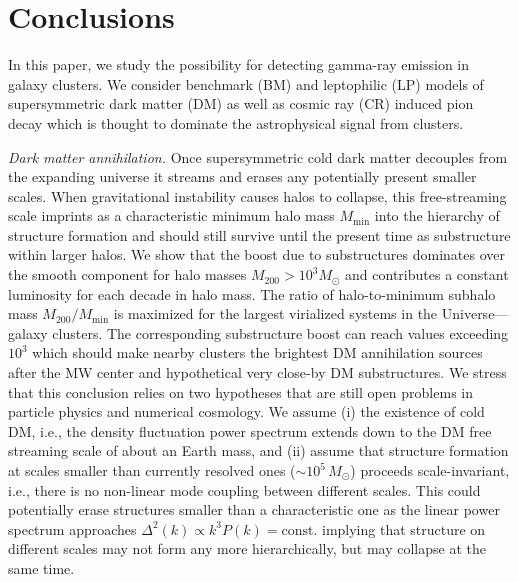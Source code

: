 \documentclass[10pt,aps,pra,reprint,amsmath,amsfonts,amssymb,showpacs,nofootinbib,floatfix]{revtex4-1}
\newcommand{\rmn}{\mathrm}
\newcommand{\msun}{M_\odot}
\newcommand{\mvir}{M_{200}}
\begin{document}
\section{Conclusions}

In this paper, we study the possibility for detecting gamma-ray
emission in galaxy clusters. We consider benchmark (BM) and
leptophilic (LP) models of supersymmetric dark matter (DM) as well as
cosmic ray (CR) induced pion decay which is thought to dominate the
astrophysical signal from clusters.

{\em Dark matter annihilation.} Once supersymmetric cold dark matter
decouples from the expanding universe it streams and erases any
potentially present smaller scales. When gravitational instability
causes halos to collapse, this free-streaming scale imprints as a
characteristic minimum halo mass $M_\mathrm{min}$ into the hierarchy
of structure formation and should still survive until the present time
as substructure within larger halos. We show that the boost due to
substructures dominates over the smooth component for halo masses
$\mvir>10^3 \msun$ and contributes a constant luminosity for each
decade in halo mass. The ratio of halo-to-minimum subhalo mass
$\mvir/M_\mathrm{min}$ is maximized for the largest virialized systems
in the Universe---galaxy clusters. The corresponding substructure
boost can reach values exceeding $10^3$ which should make nearby
clusters the brightest DM annihilation sources after the MW center and
hypothetical very close-by DM substructures. We stress that this
conclusion relies on two hypotheses that are still open problems in
particle physics and numerical cosmology. We assume (i) the existence
of cold DM, i.e., the density fluctuation power spectrum extends down
to the DM free streaming scale of about an Earth mass, and (ii) assume
that structure formation at scales smaller than currently resolved
ones ($\sim 10^5\,\msun$) proceeds scale-invariant, i.e., there is no
non-linear mode coupling between different scales. This could
potentially erase structures smaller than a characteristic one as the
linear power spectrum approaches $\Delta^2(k) \propto k^3
P(k)=\rmn{const.}$ implying that structure on different scales may not
form any more hierarchically, but may collapse at the same time.
\end{document}
